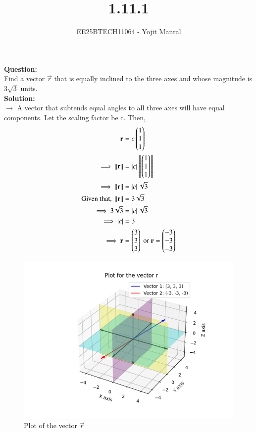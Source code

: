 \documentclass[journal]{IEEEtran}
\begin{document}

\vspace{3cm}

\title{1.11.1}
\author{EE25BTECH11064 - Yojit Manral}

\maketitle
{\let\newpage\relax\maketitle}
\renewcommand{\thefigure}{\theenumi}
\renewcommand{\thetable}{\theenumi}
\setlength{\intextsep}{10pt} %

\textbf{Question:}\\
Find a vector $\vec{r}$ that is equally inclined to the three axes and whose magnitude is $3\sqrt{3}$ units. \\

\textbf{Solution:}\\
$\rightarrow$ A vector that subtends equal angles to all three axes will have equal components. Let the scaling factor be c. Then,\\

\begin{align}
	\mathbf{r} &= c\begin{pmatrix}1\\1\\1\end{pmatrix} \\
	\implies \left\lVert\mathbf{r}\right\rVert &= \left\vert c\right\vert\left\lVert\begin{pmatrix}1\\1\\1\end{pmatrix}\right\rVert \\
	\implies \left\lVert\mathbf{r}\right\rVert &= \left\vert c\right\vert\sqrt{3} \\
    \text{Given that, } \left\lVert\mathbf{r}\right\rVert &= 3\sqrt{3} \\
	\implies 3\sqrt{3} &= \left\vert c\right\vert\sqrt{3}\\
	\implies \left\vert c\right\vert &= 3\\
    \implies \mathbf{r}&=\begin{pmatrix}3\\3\\3\end{pmatrix} \text{ or } \mathbf{r}=\begin{pmatrix}-3\\-3\\-3\end{pmatrix}
\end{align}

\begin{figure}[h!]
   \centering
   \includegraphics[width=0.8\columnwidth]{figs/01.png}
   \caption{Plot of the vector $\vec{r}$}
   \label{Plot_1}
\end{figure}
\end{document}
